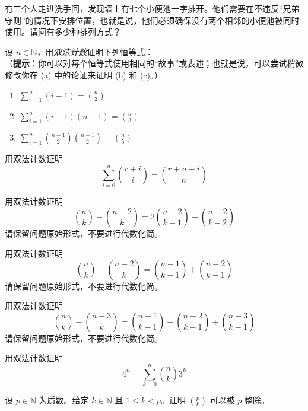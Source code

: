 \begin{exercise}
    有三个人走进洗手间，发现墙上有七个小便池一字排开。他们需要在不违反``兄弟守则''的情况下安排位置，也就是说，他们必须确保没有两个相邻的小便池被同时使用。请问有多少种排列方式？
\end{exercise}

\begin{exercise}
    设 $n \in \mathbb{N}$，用\emph{双法计数}证明下列恒等式：\\
    （\textbf{提示}：你可以对每个恒等式使用相同的``故事''或表述；也就是说，可以尝试稍微修改你在 (a) 中的论证来证明 (b) 和 (c)。）
    \begin{enumerate}[label=(\alph*)]
        \item $\displaystyle \sum_{i=1}^{n}(i-1) = {n \choose 2}$
        \item $\displaystyle \sum_{i=1}^{n}(i-1)(n-1) = {n \choose 3}$
        \item $\displaystyle \sum_{i=1}^{n}{n-1 \choose 2}{n-1 \choose 2} = {n \choose 5}$
    \end{enumerate}
\end{exercise}

\begin{exercise}
    用双法计数证明
    \[\sum_{i=0}^{n}{r+i \choose i}={r+n+i \choose n}\]
\end{exercise}

\begin{exercise}
    用双法计数证明
    \[{n \choose k}-{n-2 \choose k} = 2{n-2 \choose k-1}+{n-2 \choose k-2}\]
    请保留问题原始形式，不要进行代数化简。
\end{exercise}

\begin{exercise}
    用双法计数证明
    \[{n \choose k}-{n-2 \choose k} = {n-1 \choose k-1}+{n-2 \choose k-1}\]
    请保留问题原始形式，不要进行代数化简。
\end{exercise}

\begin{exercise}
    用双法计数证明
    \[{n \choose k}-{n-3 \choose k} = {n-1 \choose k-1}+{n-2 \choose k-1}+{n-3 \choose k-1}\]
    请保留问题原始形式，不要进行代数化简。
\end{exercise}

\begin{exercise}
    用双法计数证明
    \[4^n = \sum_{k=0}^{n}{n \choose k}3^k\]
\end{exercise}

\begin{exercise}\label{exc:exercises8.9.24}
    设 $p \in \mathbb{N}$ 为质数。给定 $k \in \mathbb{N}$ 且 $1 \le k < p$。证明 ${p \choose k}$ 可以被 $p$ 整除。
\end{exercise}

